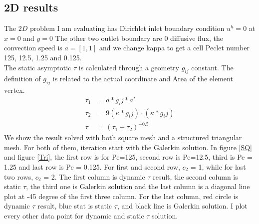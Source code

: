 \documentclass[10pt]{article}
\begin{document}
\subsection{2D results}
The $2D$ problem I am evaluating has Dirichlet inlet boundary condition $u^{h} = 0$ at $x=0$ and $y=0$ The other two outlet boundary are 0 diffusive flux, the convection speed is $a = [1,1]$ and we change kappa to get a cell Peclet number 125, 12.5, 1.25 and 0.125.\\
The static asymptotic $\tau$ is calculated through a geometry $g_{ij}$ constant. The definition of $g_{ij}$ is related to the actual coordinate and Area of the element vertex.
\begin{equation}
    \begin{aligned}
       \tau_1  &= a*g_ij*a' \\
       \tau_2  &= 9(\kappa*g_ij)\cdot (\kappa*g_ij) \\
       \tau &=(\tau_1+\tau_2)^{-0.5}
    \end{aligned}\label{eq:2} 
\end{equation}
We show the result solved with both square mesh and a structured triangular mesh. For both of them, iteration start with the Galerkin solution. In figure \ref{SQ} and figure \ref{Tri}, the first row is for Pe=125, second row is Pe=12.5, third is Pe = 1.25 and last row is Pe = 0.125. For first and second row, $c_2$ = 1, while for last two rows, $c_2$ = 2. The first column is dynamic $\tau$ result, the second column is static $\tau$, the third one is Galerkin solution and the last column is a diagonal line plot at -45 degree of the first three column. For the last column, red circle is dynamic $\tau$ result, blue stat is static $\tau$, and black line is Galerkin solution. I plot every other data point for dynamic and static $\tau$ solution.
\end{document}
